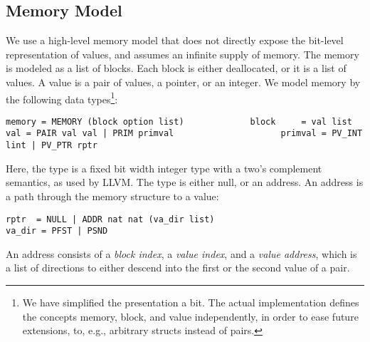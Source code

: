 \documentclass[a4paper,oribibl,envcountsame]{llncs}
\begin{document}
\subsection{Memory Model}
We use a high-level memory model that does not directly expose the bit-level representation of values, and assumes an infinite supply of memory. 
The memory is modeled as a list of blocks. Each block is either deallocated, or it is a list of values.
A value is a pair of values, a pointer, or an integer. We model memory by the following data types\footnote{We have simplified the presentation a bit. 
The actual implementation defines the concepts memory, block, and value independently, in order to ease future extensions, to, e.g., arbitrary structs instead of pairs.
}:
\begin{lstlisting}
memory = MEMORY (block option list)             block     = val list 
val = PAIR val val | PRIM primval                     primval = PV_INT lint | PV_PTR rptr
\end{lstlisting}
%
Here, the type  is a fixed bit width integer type with a two's complement semantics, as used by LLVM. 
The type  is either null, or an address. An address is a path through the memory structure to a value:
\begin{lstlisting}
rptr  = NULL | ADDR nat nat (va_dir list)                                 va_dir = PFST | PSND
\end{lstlisting}
An address consists of a \emph{block index}, a \emph{value index}, and a \emph{value address}, which is a list of directions 
to either descend into the first or the second value of a pair.
\end{document}

